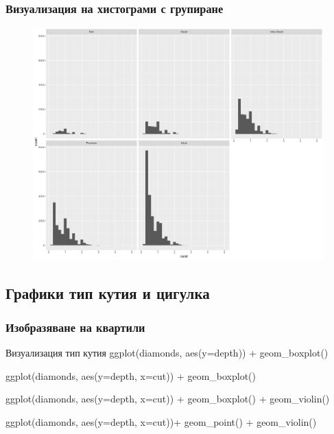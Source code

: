 \documentclass{beamer}
\begin{document}
\begin{frame}
\frametitle{Визуализация на хистограми с групиране}
\begin{figure}[]\includegraphics[width=\textwidth,height=0.75\textheight]{pic0036}\end{figure}
\end{frame}

\subsection{Графики тип кутия и цигулка}

\begin{frame}
\frametitle{Изобразяване на квартили}
\begin{block}{Визуализация тип кутия}
ggplot(diamonds, aes(y=depth)) + geom\_boxplot()

ggplot(diamonds, aes(y=depth, x=cut)) + geom\_boxplot()

ggplot(diamonds, aes(y=depth, x=cut)) + geom\_boxplot() + geom\_violin()

ggplot(diamonds, aes(y=depth, x=cut))+ geom\_point() + geom\_violin()
\end{block}
\end{frame}
\end{document}
